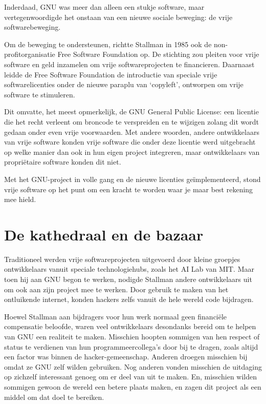 \documentclass[smalldemyvopaper,11pt,twoside,onecolumn,openright,extrafontsizes,hidelinks]{memoir}
\begin{document}
Inderdaad, GNU was meer dan alleen een stukje software, maar
vertegenwoordigde het onstaan van een nieuwe sociale beweging: de vrije
softwarebeweging.

Om de beweging te ondersteunen, richtte Stallman in 1985 ook de
non-profitorganisatie Free Software Foundation op. De stichting zou
pleiten voor vrije software en geld inzamelen om vrije softwareprojecten
te financieren. Daarnaast leidde de Free Software Foundation de
introductie van speciale vrije softwarelicenties onder de nieuwe paraplu
van `copyleft', ontworpen om vrije software te stimuleren.

Dit omvatte, het meest opmerkelijk, de GNU General Public License: een
licentie die het recht verleent om broncode te verspreiden en te
wijzigen zolang dit wordt gedaan onder even vrije voorwaarden. Met
andere woorden, andere ontwikkelaars van vrije software konden vrije
software die onder deze licentie werd uitgebracht op welke manier dan
ook in hun eigen project integreren, maar ontwikkelaars van propriëtaire
software konden dit niet.

Met het GNU-project in volle gang en de nieuwe licenties
geïmplementeerd, stond vrije software op het punt om een kracht te
worden waar je maar best rekening mee hield.

\section{De kathedraal en de bazaar}\label{de-kathedraal-en-de-bazaar}

Traditioneel werden vrije softwareprojecten uitgevoerd door kleine
groepjes ontwikkelaars vanuit speciale technologiehubs, zoals het AI Lab
van MIT. Maar toen hij aan GNU begon te werken, nodigde Stallman andere
ontwikkelaars uit om ook aan zijn project mee te werken. Door gebruik te
maken van het ontluikende internet, konden hackers zelfs vanuit de hele
wereld code bijdragen.

Hoewel Stallman aan bijdragers voor hun werk normaal geen financiële
compensatie beloofde, waren veel ontwikkelaars desondanks bereid om te
helpen van GNU een realiteit te maken. Misschien hoopten sommigen van
hen respect of status te verdienen van hun programmeercollega's door bij
te dragen, zoals altijd een factor was binnen de hacker-gemeenschap.
Anderen droegen misschien bij omdat ze GNU zelf wilden gebruiken. Nog
anderen vonden misschien de uitdaging op zichzelf interessant genoeg om
er deel van uit te maken. En, misschien wilden sommigen gewoon de wereld
een betere plaats maken, en zagen dit project als een middel om dat doel
te bereiken.
\end{document}

